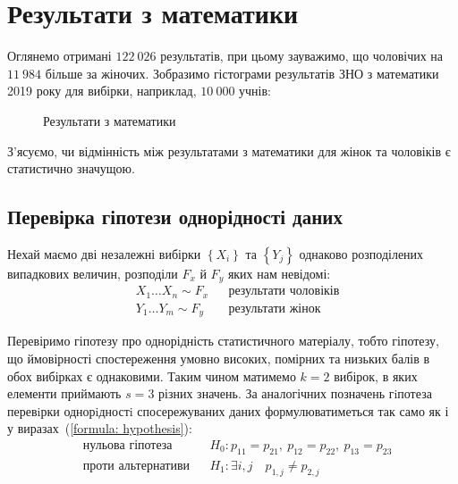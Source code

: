 \section*{Результати з математики}

Оглянемо отримані $122\ 026$ результатів, при цьому зауважимо, що чоловічих на $11\ 984$ більше за жіночих. 
Зобразимо гістограми результатів ЗНО з математики 2019 року для вибірки, наприклад, $10\ 000$ учнів:

\begin{figure}[H]
    \caption{Результати з математики}
    \label{fig:MATH initial data}
\end{figure}

З'ясуємо, чи відмінність між результатами з математики для жінок та чоловіків є статистично значущою.

\subsection*{Перевірка гіпотези однорідності даних}

Нехай маємо дві незалежні вибірки $\left\{ X_i \right\}$ та $\left\{ Y_j \right\}$ однаково розподілених 
випадкових величин, розподіли $F_x$ й $F_y$ яких нам невідомі:
\begin{align*}
    &X_1 \ldots X_n\sim F_x && \text{результати чоловіків} \\
    &Y_1 \ldots Y_m\sim F_y && \text{результати жінок}
\end{align*}

Перевіримо гіпотезу про однорідність статистичного матеріалу, тобто гіпотезу, що ймовірності 
спостереження умовно високих, помірних та низьких балів в обох вибірках є однаковими. Таким чином 
матимемо $k=2$ вибірок, в яких елементи приймають $s=3$ різних значень. За аналогічних позначень гiпотеза 
перевiрки однорiдностi спосережуваних даних формулюватиметься так само як і у виразах~(\ref{formula: hypothesis}):
\begin{align*}
    &\text{нульова гіпотеза} &&H_0: p_{11}=p_{21},\ p_{12}=p_{22},\ p_{13}=p_{23} \\
    &\text{проти альтернативи} && H_1: \exists i,j\quad p_{1,j}\neq p_{2,j}
\end{align*}

